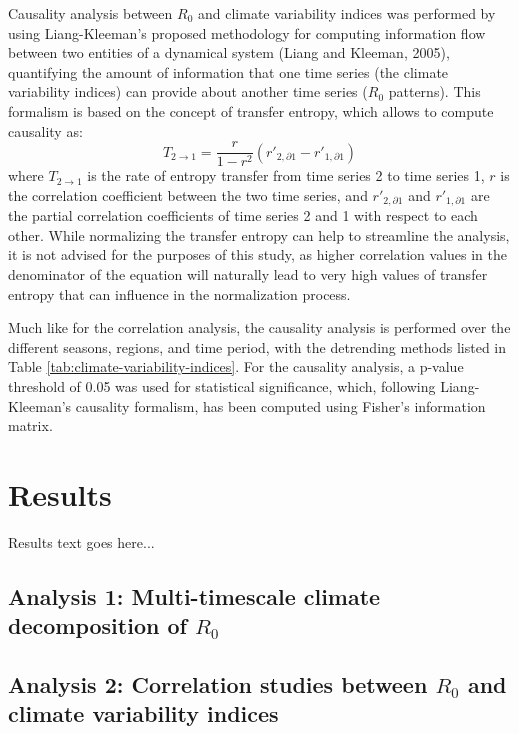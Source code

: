 \documentclass[fleqn,10pt]{wlscirep}
\begin{document}
  Causality analysis between $R_0$ and climate variability indices was performed by using Liang-Kleeman's proposed methodology for computing information flow between two entities of a dynamical system (Liang and Kleeman, 2005), quantifying the amount of information that one time series (the climate variability indices) can provide about another time series ($R_0$ patterns). This formalism is based on the concept of transfer entropy, which allows to compute causality as:
  \begin{equation}
      T_{2 \rightarrow 1} = \frac{r}{1-r^2}(r'_{2,\partial 1} - r'_{1,\partial 1})
  \end{equation}
  where $T_{2 \rightarrow 1}$ is the rate of entropy transfer from time series 2 to time series 1, $r$ is the correlation coefficient between the two time series, and $r'_{2,\partial 1}$ and $r'_{1,\partial 1}$ are the partial correlation coefficients of time series 2 and 1 with respect to each other. While normalizing the transfer entropy can help to streamline the analysis, it is not advised for the purposes of this study, as higher correlation values in the denominator of the equation will naturally lead to very high values of transfer entropy that can influence in the normalization process.

  Much like for the correlation analysis, the causality analysis is performed over the different seasons, regions, and time period, with the detrending methods listed in Table \ref{tab:climate-variability-indices}. For the causality analysis, a p-value threshold of 0.05 was used for statistical significance, which, following Liang-Kleeman's causality formalism, has been computed using Fisher's information matrix. 


  \section{Results}

  Results text goes here...

  \subsection{Analysis 1: Multi-timescale climate decomposition of $R_0$} \label{sec-results-1}

  \subsection{Analysis 2: Correlation studies between $R_0$ and climate variability indices} \label{sec-results-2} \label{sec-results-2}
\end{document}
